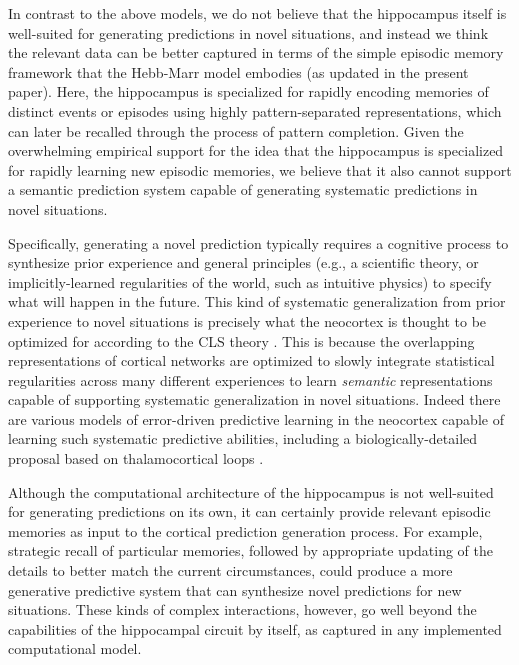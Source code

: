 \documentclass[11pt,twoside]{article}
\newif\myifpdf
\begin{document}
In contrast to the above models, we do not believe that the hippocampus itself is well-suited for generating predictions in novel situations, and instead we think the relevant data can be better captured in terms of the simple episodic memory framework that the Hebb-Marr model embodies  (as updated in the present paper).  Here, the hippocampus is specialized for rapidly encoding memories of distinct events or episodes using highly pattern-separated representations, which can later be recalled through the process of pattern completion.  Given the overwhelming empirical support for the idea that the hippocampus is specialized for rapidly learning new episodic memories, we believe that it also cannot support a semantic prediction system capable of generating systematic predictions in novel situations.

Specifically, generating a novel prediction typically requires a cognitive process to synthesize prior experience and general principles (e.g., a scientific theory, or implicitly-learned regularities of the world, such as intuitive physics) to specify what will happen in the future.  This kind of systematic generalization from prior experience to novel situations is precisely what the neocortex is thought to be optimized for according to the CLS theory \citep{McClellandMcNaughtonOReilly95,OReillyBhattacharyyaHowardEtAl14,OReillyRanganathRussin21}.  This is because the overlapping representations of cortical networks are optimized to slowly integrate statistical regularities across many different experiences to learn \emph{semantic} representations capable of supporting systematic generalization in novel situations. Indeed there are various models of error-driven predictive learning in the neocortex capable of learning such systematic predictive abilities, including a biologically-detailed proposal based on thalamocortical loops \citep{OReillyRussinZolfagharEtAl21}. 

Although the computational architecture of the hippocampus is not well-suited for generating predictions on its own, it can certainly provide relevant episodic memories as input to the cortical prediction generation process.  For example, strategic recall of particular memories, followed by appropriate updating of the details to better match the current circumstances, could produce a more generative predictive system that can synthesize novel predictions for new situations. These kinds of complex interactions, however, go well beyond the capabilities of the hippocampal circuit by itself, as captured in any implemented computational model.
\end{document}
